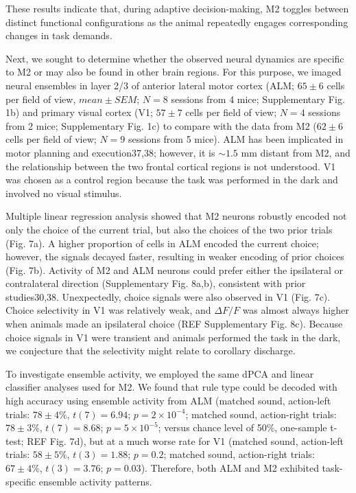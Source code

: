 These results indicate that, during adaptive decision-making, M2 toggles between distinct functional configurations as the animal repeatedly engages corresponding changes in task demands.

Next, we sought to determine whether the observed neural dynamics are specific to M2 or may also be found in other brain regions. For this purpose, we imaged neural ensembles in layer 2/3 of anterior lateral motor cortex (ALM; $65 \pm 6$ cells per field of view, $mean \pm SEM$; $N = 8$ sessions from 4 mice; Supplementary Fig. 1b) and primary visual cortex (V1; $57 \pm 7$ cells per field of view; $N = 4$ sessions from 2 mice; Supplementary Fig. 1c) to compare with the data from M2 ($62 \pm 6$ cells per field of view; $N = 9$ sessions from 5 mice). ALM has been implicated in motor planning and execution37,38; however, it is $\sim 1.5$ mm distant from M2, and the relationship between the two frontal cortical regions is not understood. V1 was chosen as a control region because the task was performed in the dark and involved no visual stimulus. 

Multiple linear regression analysis showed that M2 neurons robustly encoded not only the choice of the current trial, but also the choices of the two prior trials (Fig. 7a). A higher proportion of cells in ALM encoded the current choice; however, the signals decayed faster, resulting in weaker encoding of prior choices (Fig. 7b). Activity of M2 and ALM neurons could prefer either the ipsilateral or contralateral direction (Supplementary Fig. 8a,b), consistent with prior studies30,38. Unexpectedly, choice signals were also observed in V1 (Fig. 7c). Choice selectivity in V1 was relatively weak, and $\Delta F/F$ was almost always higher when animals made an ipsilateral choice (REF Supplementary Fig. 8c). Because choice signals in V1 were transient and animals performed the task in the dark, we conjecture that the selectivity might relate to corollary discharge. 

To investigate ensemble activity, we employed the same dPCA and linear classifier analyses used for M2. We found that rule type could be decoded with high accuracy using ensemble activity from ALM (matched sound, action-left trials: $78 \pm 4\%$, $t(7) = 6.94$; $p = 2 \times 10^{-4}$; matched sound, action-right trials: $78 \pm 3\%$, $t(7) = 8.68$; $p = 5 \times 10^{-5}$; versus chance level of 50\%, one-sample t-test; REF Fig. 7d), but at a much worse rate for V1 (matched sound, action-left trials: $58 \pm 5\%$, $t(3) = 1.88$; $p = 0.2$; matched sound, action-right trials: $67 \pm 4\%$, $t(3) = 3.76$; $p = 0.03$). Therefore, both ALM and M2 exhibited task-specific ensemble activity patterns. 

